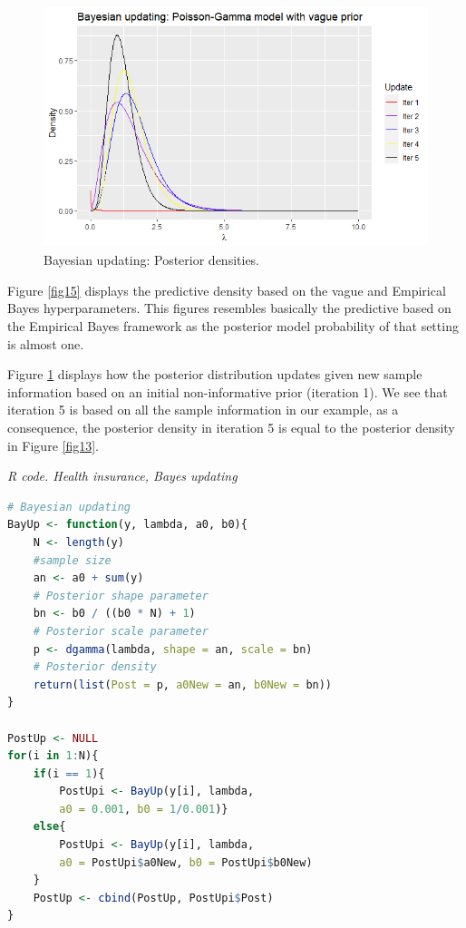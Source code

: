 \begin{figure}[!h]
	\includegraphics[width=340pt, height=200pt]{Chapters/chapter1/figures/Updating.png}
	\caption[List of figure caption goes here]{Bayesian updating: Posterior densities.}\label{fig16}
\end{figure}

Figure \ref{fig15} displays the predictive density based on the vague and Empirical Bayes hyperparameters. This figures resembles basically the predictive based on the Empirical Bayes framework as the posterior model probability of that setting is almost one.

Figure \ref{fig16} displays how the posterior distribution updates given new sample information based on an initial non-informative prior (iteration 1). We see that iteration 5 is based on all the sample information in our example, as a consequence, the posterior density in iteration 5 is equal to the posterior density in Figure \ref{fig13}.

\begin{tcolorbox}[enhanced,width=4.67in,center upper,
	fontupper=\large\bfseries,drop shadow southwest,sharp corners]
\textit{R code. Health insurance, Bayes updating}
\begin{VF}
\begin{lstlisting}[basicstyle=\footnotesize, language=R]
# Bayesian updating
BayUp <- function(y, lambda, a0, b0){
	N <- length(y)
	#sample size
	an <- a0 + sum(y) 
	# Posterior shape parameter
	bn <- b0 / ((b0 * N) + 1) 
	# Posterior scale parameter
	p <- dgamma(lambda, shape = an, scale = bn) 
	# Posterior density
	return(list(Post = p, a0New = an, b0New = bn))
}

PostUp <- NULL
for(i in 1:N){
	if(i == 1){
		PostUpi <- BayUp(y[i], lambda, 
		a0 = 0.001, b0 = 1/0.001)}
	else{
		PostUpi <- BayUp(y[i], lambda, 
		a0 = PostUpi$a0New, b0 = PostUpi$b0New)
	}
	PostUp <- cbind(PostUp, PostUpi$Post)
}

\end{lstlisting}
\end{VF}
\end{tcolorbox}

